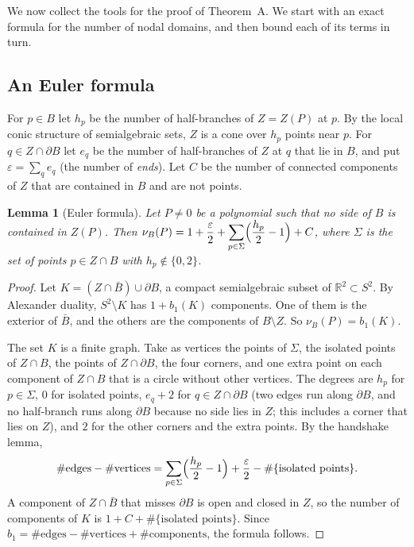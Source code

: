 \documentclass[11pt]{amsart}
\newtheorem{lemma}[theorem]{Lemma}
\theoremstyle{definition}
\theoremstyle{remark}
\newcommand{\R}{\mathbb{R}}
\numberwithin{equation}{section}
\begin{document}
We now collect the tools for the proof of Theorem~A. We start with an exact formula for the
number of nodal domains, and then bound each of its terms in turn.

\subsection{An Euler formula}
For $p\in B$ let $h_p$ be the number of half-branches of $Z=Z(P)$ at $p$. By the local conic
structure of semialgebraic sets, $Z$ is a cone over $h_p$ points near $p$. For
$q\in Z\cap\partial B$ let $e_q$ be the number of half-branches of $Z$ at $q$ that lie in
$B$, and put $\varepsilon=\sum_qe_q$ (the number of \emph{ends}). Let $C$ be the number of
connected components of $Z$ that are contained in $B$ and are not points.

\begin{lemma}[Euler formula]\label{lem:euler}
Let $P\ne0$ be a polynomial such that no side of $B$ is contained in $Z(P)$. Then
$\displaystyle\nu_B(P)=1+\frac{\varepsilon}{2}+\sum_{p\in\Sigma}\Bigl(\frac{h_p}{2}-1\Bigr)+C$,
where $\Sigma$ is the set of points $p\in Z\cap B$ with $h_p\notin\{0,2\}$.
\end{lemma}

\begin{proof}
Let $K=(Z\cap\bar B)\cup\partial B$, a compact semialgebraic subset of $\R^2\subset S^2$. By
Alexander duality, $S^2\setminus K$ has $1+b_1(K)$ components. One of them is the exterior of
$\bar B$, and the others are the components of $B\setminus Z$. So $\nu_B(P)=b_1(K)$.

The set $K$ is a finite graph. Take as vertices the points of $\Sigma$, the isolated points of
$Z\cap B$, the points of $Z\cap\partial B$, the four corners, and one extra point on each
component of $Z\cap B$ that is a circle without other vertices. The degrees are $h_p$ for
$p\in\Sigma$, $0$ for isolated points, $e_q+2$ for $q\in Z\cap\partial B$ (two edges run
along $\partial B$, and no half-branch runs along $\partial B$ because no side lies in $Z$;
this includes a corner that lies on $Z$), and $2$ for the other corners and the extra points. By the handshake lemma,
\[
\#\text{edges}-\#\text{vertices}=\sum_{p\in\Sigma}\Bigl(\frac{h_p}{2}-1\Bigr)+\frac{\varepsilon}{2}
-\#\{\text{isolated points}\}.
\]
A component of $Z\cap\bar B$ that misses $\partial B$ is open and closed in $Z$, so the
number of components of $K$ is $1+C+\#\{\text{isolated points}\}$. Since
$b_1=\#\text{edges}-\#\text{vertices}+\#\text{components}$, the formula follows.
\end{proof}
\end{document}
